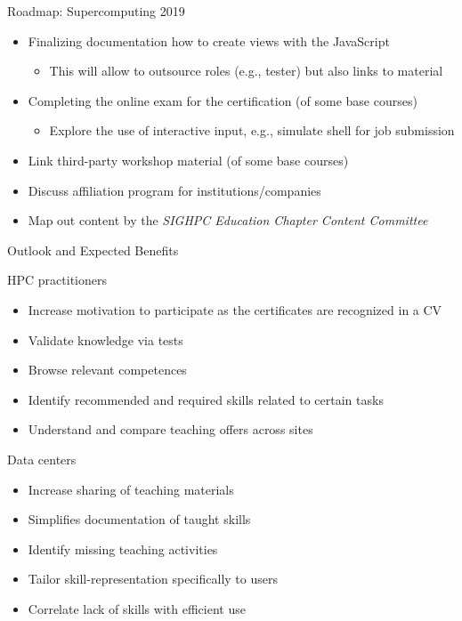 \documentclass[compress,aspectratio=169]{beamer}
\begin{document}
\begin{frame}{Roadmap: Supercomputing 2019}
		\begin{itemize}
			\item Finalizing documentation how to create views with the JavaScript
        \begin{itemize}
          \item This will allow to outsource roles (e.g., tester) but also links to material
        \end{itemize}
			\item Completing the online exam for the certification (of some base courses)
				\begin{itemize}
					\item Explore the use of interactive input, e.g., simulate shell for job submission
				\end{itemize}
      \item Link third-party workshop material (of some base courses)
			\item Discuss affiliation program for institutions/companies
			\item Map out content by the \textit{SIGHPC Education Chapter Content Committee}
		\end{itemize}
  \label{frame:last}
\end{frame}


\begin{frame}{Outlook and Expected Benefits}
	\begin{block}{HPC practitioners}
		\vspace*{-0.2cm}
	\begin{itemize}
	\item Increase motivation to participate as the certificates are recognized in a CV
	\item Validate knowledge via tests
	\item Browse relevant competences
	\item Identify recommended and required skills related to certain tasks
	\item Understand and compare teaching offers across sites
	\end{itemize}
	\end{block}
	\vspace*{-0.3cm}
	\begin{block}{Data centers}
		\vspace*{-0.2cm}
	\begin{itemize}
	\item Increase sharing of teaching materials
	\item Simplifies documentation of taught skills
	\item Identify missing teaching activities
	\item Tailor skill-representation specifically to users
	\item Correlate lack of skills with efficient use
	\end{itemize}
	\end{block}
\end{frame}
\end{document}
